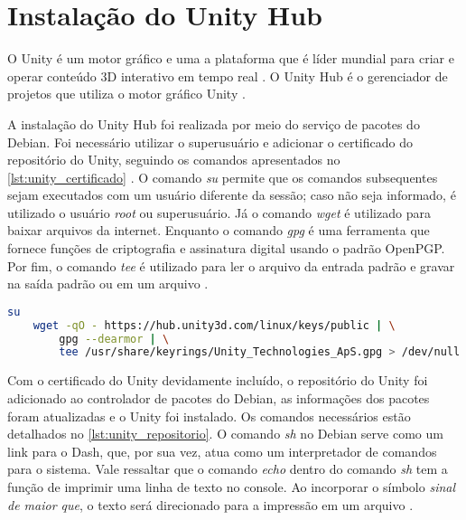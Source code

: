 \section{Instalação do Unity Hub}
\label{sec:instalacao_unityhub}

O Unity é um motor gráfico e uma a plataforma que é líder mundial para criar e operar conteúdo 3D interativo em tempo real \cite{unity_get_started}. O Unity Hub é o gerenciador de projetos que utiliza o motor gráfico Unity \cite{unity_download}.

A instalação do Unity Hub foi realizada por meio do serviço de pacotes do Debian. Foi necessário utilizar o superusuário e adicionar o certificado do repositório do Unity, seguindo os comandos apresentados no \cref{lst:unity_certificado} \cite{install_the_unity_hub}. O comando \emph{su} permite que os comandos subsequentes sejam executados com um usuário diferente da sessão; caso não seja informado, é utilizado o usuário \emph{root} ou superusuário. Já o comando \emph{wget} é utilizado para baixar arquivos da internet. Enquanto o comando \emph{gpg} é uma ferramenta que fornece funções de criptografia e assinatura digital usando o padrão OpenPGP. Por fim, o comando \emph{tee} é utilizado para ler o arquivo da entrada padrão e gravar na saída padrão ou em um arquivo \cite{debian_man_pages}.

\begin{lstlisting}[caption={Trecho de código com comando UNIX para adicionar o certificado do repositório do Unity \cite{install_the_unity_hub}},label={lst:unity_certificado},language=Bash,showstringspaces=false]
    su
    wget -qO - https://hub.unity3d.com/linux/keys/public | \
        gpg --dearmor | \
        tee /usr/share/keyrings/Unity_Technologies_ApS.gpg > /dev/null
\end{lstlisting}

Com o certificado do Unity devidamente incluído, o repositório do Unity foi adicionado ao controlador de pacotes do Debian, as informações dos pacotes foram atualizadas e o Unity foi instalado. Os comandos necessários estão detalhados no \cref{lst:unity_repositorio}. O comando \emph{sh} no Debian serve como um link para o Dash, que, por sua vez, atua como um interpretador de comandos para o sistema. Vale ressaltar que o comando \emph{echo} dentro do comando \emph{sh} tem a função de imprimir uma linha de texto no console. Ao incorporar o símbolo \emph{sinal de maior que}, o texto será direcionado para a impressão em um arquivo \cite{debian_man_pages}.

